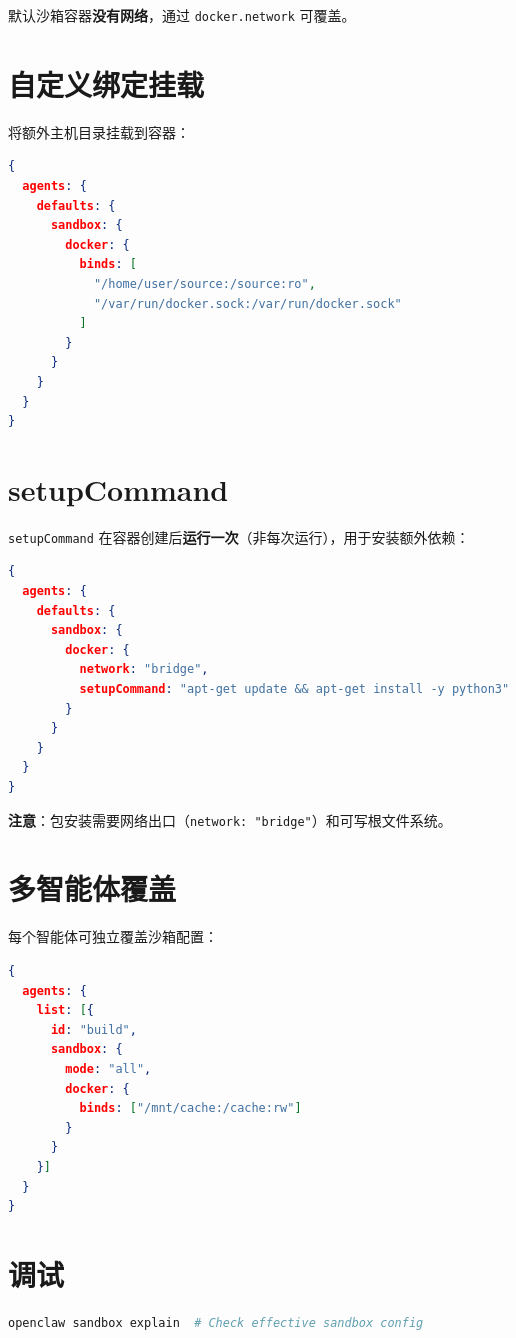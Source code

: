 默认沙箱容器\textbf{没有网络}，通过 \texttt{docker.network} 可覆盖。

\section{自定义绑定挂载}

将额外主机目录挂载到容器：

\begin{lstlisting}[language=json]
{
  agents: {
    defaults: {
      sandbox: {
        docker: {
          binds: [
            "/home/user/source:/source:ro",
            "/var/run/docker.sock:/var/run/docker.sock"
          ]
        }
      }
    }
  }
}
\end{lstlisting}

\section{setupCommand}

\texttt{setupCommand} 在容器创建后\textbf{运行一次}（非每次运行），用于安装额外依赖：

\begin{lstlisting}[language=json]
{
  agents: {
    defaults: {
      sandbox: {
        docker: {
          network: "bridge",
          setupCommand: "apt-get update && apt-get install -y python3"
        }
      }
    }
  }
}
\end{lstlisting}

\textbf{注意}：包安装需要网络出口（\texttt{network: "bridge"}）和可写根文件系统。

\section{多智能体覆盖}

每个智能体可独立覆盖沙箱配置：

\begin{lstlisting}[language=json]
{
  agents: {
    list: [{
      id: "build",
      sandbox: {
        mode: "all",
        docker: {
          binds: ["/mnt/cache:/cache:rw"]
        }
      }
    }]
  }
}
\end{lstlisting}

\section{调试}

\begin{lstlisting}[language=bash]
openclaw sandbox explain  # Check effective sandbox config
\end{lstlisting}

